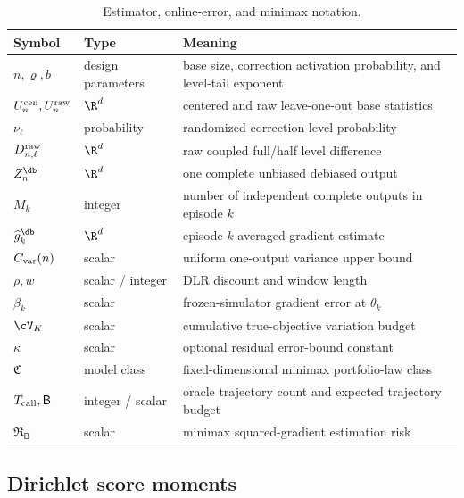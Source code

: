 \begin{table}[h]
\centering
\caption{Estimator, online-error, and minimax notation.}
\label{tab:notation-estimator}
\small
\begin{tabularx}{\textwidth}{@{}p{}p{}X@{}}
\toprule
Symbol & Type & Meaning \\
\midrule
$n,\varrho,b$ & design parameters & base size, correction activation probability, and level-tail exponent \\
$U_n^{\rm cen},U_n^{\rm raw}$ & $\R^d$ & centered and raw leave-one-out base statistics \\
$\nu_\ell$ & probability & randomized correction level probability \\
$D_{n,\ell}^{\rm raw}$ & $\R^d$ & raw coupled full/half level difference \\
$Z_n^{\db}$ & $\R^d$ & one complete unbiased debiased output \\
$M_k$ & integer & number of independent complete outputs in episode $k$ \\
$\widehat g_k^{\db}$ & $\R^d$ & episode-$k$ averaged gradient estimate \\
$C_{\rm var}(n)$ & scalar & uniform one-output variance upper bound \\
$\rho,w$ & scalar / integer & DLR discount and window length \\
$\beta_k$ & scalar & frozen-simulator gradient error at $\theta_k$ \\
$\cV_K$ & scalar & cumulative true-objective variation budget \\
$\kappa$ & scalar & optional residual error-bound constant \\
$\mathfrak C$ & model class & fixed-dimensional minimax portfolio-law class \\
$T_{\rm call},\mathsf B$ & integer / scalar & oracle trajectory count and expected trajectory budget \\
$\mathfrak R_{\mathsf B}$ & scalar & minimax squared-gradient estimation risk \\
\bottomrule
\end{tabularx}
\end{table}

\subsection{Dirichlet score moments}

